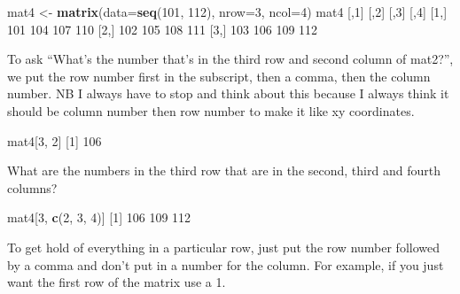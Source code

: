 \documentclass[
]{book}
\newenvironment{Shaded}{\begin{snugshade}}{\end{snugshade}}
\newcommand{\DataTypeTok}[1]{\textcolor[rgb]{0.13,0.29,0.53}{#1}}
\newcommand{\DecValTok}[1]{\textcolor[rgb]{0.00,0.00,0.81}{#1}}
\newcommand{\KeywordTok}[1]{\textcolor[rgb]{0.13,0.29,0.53}{\textbf{#1}}}
\newcommand{\NormalTok}[1]{#1}
\newcommand{\StringTok}[1]{\textcolor[rgb]{0.31,0.60,0.02}{#1}}
\begin{document}
\begin{Shaded}
\begin{Highlighting}[]
\NormalTok{mat4 <-}\StringTok{ }\KeywordTok{matrix}\NormalTok{(}\DataTypeTok{data=}\KeywordTok{seq}\NormalTok{(}\DecValTok{101}\NormalTok{, }\DecValTok{112}\NormalTok{), }\DataTypeTok{nrow=}\DecValTok{3}\NormalTok{, }\DataTypeTok{ncol=}\DecValTok{4}\NormalTok{)}
\NormalTok{mat4}
\NormalTok{     [,}\DecValTok{1}\NormalTok{] [,}\DecValTok{2}\NormalTok{] [,}\DecValTok{3}\NormalTok{] [,}\DecValTok{4}\NormalTok{]}
\NormalTok{[}\DecValTok{1}\NormalTok{,]  }\DecValTok{101}  \DecValTok{104}  \DecValTok{107}  \DecValTok{110}
\NormalTok{[}\DecValTok{2}\NormalTok{,]  }\DecValTok{102}  \DecValTok{105}  \DecValTok{108}  \DecValTok{111}
\NormalTok{[}\DecValTok{3}\NormalTok{,]  }\DecValTok{103}  \DecValTok{106}  \DecValTok{109}  \DecValTok{112}
\end{Highlighting}
\end{Shaded}

To ask ``What's the number that's in the third row and second column of mat2?'', we put the row number first in the subscript, then a comma, then the column number. NB I always have to stop and think about this because I always think it should be column number then row number to make it like xy coordinates.

\begin{Shaded}
\begin{Highlighting}[]
\NormalTok{mat4[}\DecValTok{3}\NormalTok{, }\DecValTok{2}\NormalTok{]}
\NormalTok{[}\DecValTok{1}\NormalTok{] }\DecValTok{106}
\end{Highlighting}
\end{Shaded}

What are the numbers in the third row that are in the second, third and fourth columns?

\begin{Shaded}
\begin{Highlighting}[]
\NormalTok{mat4[}\DecValTok{3}\NormalTok{, }\KeywordTok{c}\NormalTok{(}\DecValTok{2}\NormalTok{, }\DecValTok{3}\NormalTok{, }\DecValTok{4}\NormalTok{)]}
\NormalTok{[}\DecValTok{1}\NormalTok{] }\DecValTok{106} \DecValTok{109} \DecValTok{112}
\end{Highlighting}
\end{Shaded}

To get hold of everything in a particular row, just put the row number followed by a comma and don't put in a number for the column. For example, if you just want the first row of the matrix use a 1.
\end{document}
